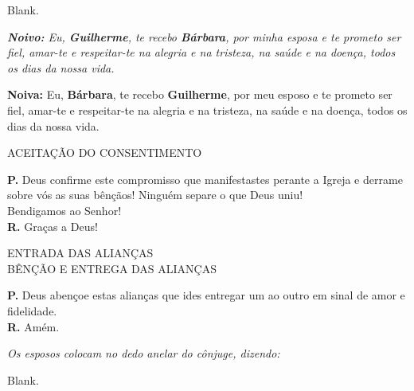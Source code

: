 \documentclass[a5paper,9pt]{memoir}
\begin{document}
{
\begin{paracol}{2}
{\color{white}Blank.}

\switchcolumn

\itshape
\textbf{Noivo:} Eu, \textbf{Guilherme}, te recebo \textbf{B\'arbara}, por minha esposa e te prometo ser fiel, amar-te e respeitar-te na alegria e na tristeza, na sa\'ude e na doen\c ca, todos os dias da nossa vida.

\textbf{Noiva:} Eu, \textbf{B\'arbara}, te recebo \textbf{Guilherme}, por meu esposo e te prometo ser fiel, amar-te e respeitar-te na alegria e na tristeza, na sa\'ude e na doen\c ca, todos os dias da nossa vida.
\end{paracol}

\begin{center}
ACEITAÇÃO DO CONSENTIMENTO
\end{center}

\textbf{P.} Deus confirme este compromisso que manifestastes perante a Igreja e derrame sobre v\'os as suas b\^en\c c\~aos! Ningu\'em separe o que Deus uniu!\\
Bendigamos ao Senhor!\\
\textbf{R.} Graças a Deus!

%	

\begin{center}
ENTRADA DAS ALIANÇAS \\ \vspace{0.1cm}
BÊNÇÃO E ENTREGA DAS ALIANÇAS
\end{center}

\textbf{P.} Deus aben\c coe {\itshape \color{mygray}\CrossMaltese} estas alian\c cas que ides entregar um ao outro em sinal de amor e fidelidade.\\
\textbf{R.} Amém.

{\itshape \color{mygray}Os esposos colocam no dedo anelar do cônjuge, dizendo:}

\begin{paracol}{2}
{\color{white}Blank.}


\end{paracol}}
\end{document}
